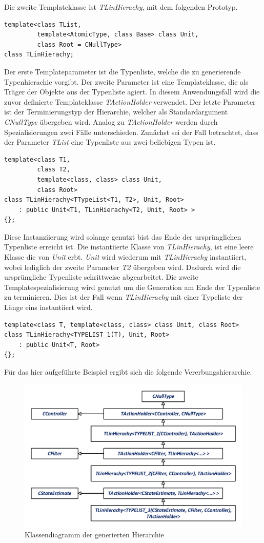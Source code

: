 Die zweite Templateklasse ist \textit{TLinHierachy}, mit dem folgenden Prototyp.
\begin{lstlisting}[caption={Deklaration der Templateklasse für lineare Hierarchien},captionpos=b]
template<class TList,
         template<AtomicType, class Base> class Unit,
         class Root = CNullType>
class TLinHierachy;
\end{lstlisting}
Der erste Templateparameter ist die Typenliste, welche die zu generierende Typenhierachie vorgibt. Der zweite Parameter ist eine Templateklasse, die als Träger der Objekte aus der Typenliste agiert. In diesem Anwendungsfall wird die zuvor definierte Templateklasse \textit{TActionHolder} verwendet. Der letzte Parameter ist der Terminierungstyp der Hierarchie, welcher als Standardargument \textit{CNullType} übergeben wird. Analog zu \textit{TActionHolder} werden durch Spezialisierungen zwei Fälle unterschieden. Zunächst sei der Fall betrachtet, dass der Parameter \textit{TList} eine Typenliste aus zwei beliebigen Typen ist.
\begin{lstlisting}[caption={Erste Templatespezialisierung der linearen Hierarchie},captionpos=b]
template<class T1, 
         class T2, 
         template<class, class> class Unit, 
         class Root>
class TLinHierachy<TTypeList<T1, T2>, Unit, Root>
	: public Unit<T1, TLinHierachy<T2, Unit, Root> >
{};
\end{lstlisting}
Diese Instanziierung wird solange genutzt bist das Ende der ursprünglichen Typenliste erreicht ist. Die instantiierte Klasse von \textit{TLinHierachy}, ist eine leere Klasse die von \textit{Unit} erbt. \textit{Unit} wird wiederum mit \textit{TLinHierachy} instantiiert, wobei lediglich der zweite Parameter \textit{T2} übergeben wird. Dadurch wird die ursprüngliche Typenliste schrittweise abgearbeitet.
Die zweite Templatespezialisierung wird genutzt um die Generation am Ende der Typenliste zu terminieren. Dies ist der Fall wenn \textit{TLinHierachy} mit einer Typeliste der Länge eins instantiiert wird.
\begin{lstlisting}[caption={Zweite Templatespezialisierung der linearen Hierarchie},captionpos=b]
template<class T, template<class, class> class Unit, class Root>
class TLinHierachy<TYPELIST_1(T), Unit, Root>
	: public Unit<T, Root>
{};
\end{lstlisting}
Für das hier aufgeführte Beispiel ergibt sich die folgende Vererbungshierarchie.
\begin{figure}[!h]
\centering
\includegraphics[width=0.7\linewidth]{img/SW_1_Signalfluss_KD.pdf}
\caption{Klassendiagramm der generierten Hierarchie}
\end{figure}
